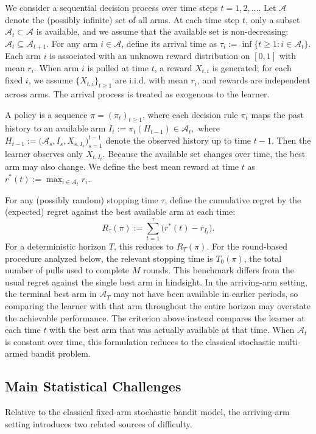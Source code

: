 \documentclass[11pt]{article}
\begin{document}
We consider a sequential decision process over time steps $t = 1, 2, \dots$. Let $\mathcal{A}$ denote the (possibly infinite) set of all arms. At each time step $t$, only a subset $\mathcal{A}_t \subset \mathcal{A}$ is available, and we assume that the available set is non-decreasing:
$\mathcal{A}_t \subseteq \mathcal{A}_{t+1}.$
For any arm $i \in \mathcal{A}$, define its arrival time as
$\tau_i := \inf\{t\ge 1: i \in \mathcal{A}_t\}$.
Each arm $i$ is associated with an unknown reward distribution on $[0,1]$ with mean $r_i$. When arm $i$ is pulled at time $t$, a reward $X_{t,i}$ is generated; for each fixed $i$, we assume $\{X_{t,i}\}_{t\ge 1}$ are i.i.d. with mean $r_i$, and rewards are independent across arms. The arrival process is treated as exogenous to the learner.

A policy is a sequence $\pi = (\pi_t)_{t\ge 1}$, where each decision rule $\pi_t$ maps the past history to an available arm $I_t := \pi_t(H_{t-1}) \in \mathcal{A}_t,$ where $H_{t-1} := \big(\mathcal{A}_s, I_s, X_{s,I_s}\big)_{s=1}^{t-1}$
denote the observed history up to time $t-1$. Then the learner observes only $X_{t,I_t}$. Because the available set changes over time, the best arm may also change. We define the best mean reward at time $t$ as
$r^*(t) := \max_{i \in \mathcal{A}_t} r_i.$

For any (possibly random) stopping time $\tau$, define the cumulative regret by the (expected) regret against the best available arm at each time:
\[
R_{\tau}(\pi):=\sum_{t=1}^{\tau}\bigl(r^*(t)-r_{I_t}\bigr).
\]
For a deterministic horizon $T$, this reduces to $R_T(\pi)$. For the round-based procedure analyzed below,
the relevant stopping time is $T_0(\pi)$, the total number of pulls used to complete $M$
rounds. 
This benchmark differs from the usual regret against the single best arm in hindsight. In the arriving-arm setting, the terminal best arm in \(\mathcal{A}_T\) may not have been available in earlier periods, so comparing the learner with that arm throughout the entire horizon may overstate the achievable performance. The criterion above instead compares the learner at each time \(t\) with the best arm that was actually available at that time. When \(\mathcal{A}_t\) is constant over time, this formulation reduces to the classical stochastic multi-armed bandit problem.

\subsection{Main Statistical Challenges}
Relative to the classical fixed-arm stochastic bandit model, the arriving-arm setting introduces two related sources of difficulty.
\end{document}

